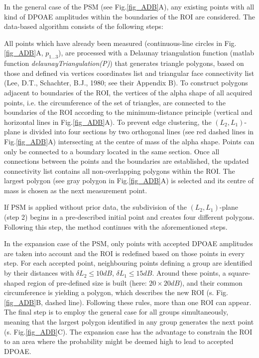 \documentclass[journal,twoside,web]{ieeecolor2}
\begin{document}
In the general case of the PSM (see Fig.\ref{fig_ADB}A), any existing points with all kind of DPOAE amplitudes within the boundaries of the ROI are considered.
The data-based algorithm consists of the following steps:
\begin{algorithmic}[1]
\STATE All points which have already been measured (continuous-line circles in Fig.\ref{fig_ADB}A, $p_{1...3}$), are processed with a Delaunay triangulation function (matlab function \textit{delaunayTriangulation(P)}) that generates triangle polygons, based on those and defined via vertices coordinates list and triangular face connectivity list (Lee, D.T., Schachter, B.J., 1980; see their Appendix B).
\STATE To construct polygons adjacent to boundaries of the ROI, the vertices of the alpha shape of all acquired points, i.e. the circumference of the set of triangles, are connected to the boundaries of the ROI according to the minimum-distance principle (vertical and horizontal lines in Fig.\ref{fig_ADB}A).
To prevent edge clustering, the $(L_2, L_1)$-plane is divided into four sections by two orthogonal lines (see red dashed lines in Fig.\ref{fig_ADB}A) intersecting at the centre of mass of the alpha shape.
Points can only be connected to a boundary located in the same section.
\STATE Once all connections between the points and the boundaries are established, the updated connectivity list contains all non-overlapping polygons within the ROI.
The largest polygon (see gray polygon in Fig.\ref{fig_ADB}A) is selected and its centre of mass is chosen as the next measurement point.
\end{algorithmic} 

If PSM is applied without prior data, the subdivision of the $(L_2, L_1)$-plane (step 2) begins in a pre-described initial point and creates four different polygons.
Following this step, the method continues with the aforementioned steps.

In the expansion case of the PSM, only points with accepted DPOAE amplitudes are taken into account and the ROI is redefined based on those points in every step.
For each accepted point, neighbouring points defining a group are identified by their distances with $\delta L_2 \le 10 dB$, $\delta L_1 \le 15 dB$.
Around these points, a square-shaped region of pre-defined size is built (here: $20 \times 20 dB$), and their common circumference is yielding a polygon, which describes the new ROI (s. Fig.\ref{fig_ADB}B, dashed line).
Following these rules, more than one ROI can appear.
The final step is to employ the general case for all groups simultaneously, meaning that the largest polygon identified in any group generates the next point (s. Fig.\ref{fig_ADB}C).
The expansion case has the advantage to constrain the ROI to an area where the probability might be deemed high to lead to accepted DPOAE.
\end{document}
